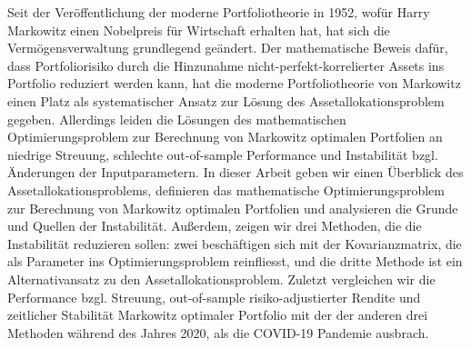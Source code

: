 Seit der Veröffentlichung der moderne Portfoliotheorie in 1952, wofür Harry Markowitz einen Nobelpreis für Wirtschaft erhalten hat, hat sich die Vermögensverwaltung grundlegend geändert. Der mathematische Beweis dafür, dass Portfoliorisiko durch die Hinzunahme nicht-perfekt-korrelierter Assets ins Portfolio reduziert werden kann, hat die moderne Portfoliotheorie von Markowitz einen Platz als systematischer Ansatz zur Lösung des Assetallokationsproblem gegeben. Allerdings leiden die Lösungen des mathematischen Optimierungsproblem zur Berechnung von Markowitz optimalen Portfolien an niedrige Streuung, schlechte out-of-sample Performance und Instabilität bzgl. Änderungen der Inputparametern. In dieser Arbeit geben wir einen Überblick des Assetallokationsproblems, definieren das mathematische Optimierungsproblem zur Berechnung von Markowitz optimalen Portfolien und analysieren die Grunde und Quellen der Instabilität. Au{\ss}erdem, zeigen wir drei Methoden, die die Instabilität reduzieren sollen: zwei beschäftigen sich mit der Kovarianzmatrix, die als Parameter ins Optimierungsproblem reinfliesst, und die dritte Methode ist ein Alternativansatz zu den Assetallokationsproblem. Zuletzt vergleichen wir die Performance bzgl. Streuung, out-of-sample risiko-adjustierter Rendite und zeitlicher Stabilität Markowitz optimaler Portfolio mit der der anderen drei Methoden während des Jahres 2020, als die COVID-19 Pandemie ausbrach.